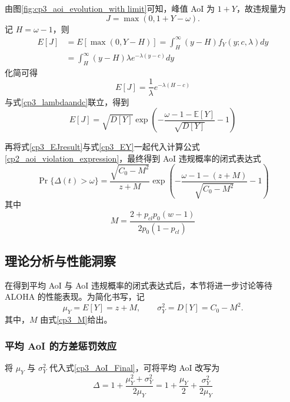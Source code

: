 由图\ref{fig:cp3_aoi_evolution_with limit}可知，峰值 AoI 为 $1+Y$，故违规量为
\[
J=\max(0,1+Y-\omega).
\]
记 $H=\omega-1$，则
\begin{equation}\label{cp3_EJ}
\begin{aligned}
    E[J] &= E[\max(0, Y - H)] = \int_{H}^{\infty} (y - H) f_Y(y; c, \lambda) dy \\
    &= \int_{H}^{\infty} (y-H)\lambda e^{-\lambda(y-c)}dy
\end{aligned}
\end{equation}
化简可得
\begin{equation}
    E[J]  = \frac{1}{\lambda} e^{-\lambda(H-c)}
\end{equation}
与式\eqref{cp3_lambdaandc}联立，得到
\begin{equation}\label{cp3_EJresult}
    E[J] = \sqrt{D[Y]} \exp\left( -\frac{\omega - 1 - \mathbb{E}[Y]}{\sqrt{D[Y]}} - 1 \right)
\end{equation}

再将式\eqref{cp3_EJresult}与式\eqref{cp3_EY}一起代入计算公式\eqref{cp2_aoi_violation_expression}，最终得到 AoI 违规概率的闭式表达式
\begin{equation}\label{cp3_violation_prob_simplified}
    \Pr\{\Delta(t) > \omega\} = \frac{\sqrt{C_0 - M^2}}{z + M} \exp\left( -\frac{\omega - 1 - (z + M)}{\sqrt{C_0 - M^2}} - 1 \right)
\end{equation}
其中
\begin{equation}\label{cp3_M}
    M = \frac{2 + p_{cl} p_0 (w-1)}{2 p_0 (1-p_{cl})}
\end{equation}

\subsection{理论分析与性能洞察}

在得到平均 AoI 与 AoI 违规概率的闭式表达式后，本节将进一步讨论等待 ALOHA 的性能表现。为简化书写，记
\[
\mu_Y = E[Y] = z + M,\qquad \sigma_Y^2 = D[Y] = C_0 - M^2.
\]
其中，$M$ 由式\eqref{cp3_M}给出。

\subsubsection{平均 AoI 的方差惩罚效应}

将 $\mu_Y$ 与 $\sigma_Y^2$ 代入式\eqref{cp3_AoI_Final}，可将平均 AoI 改写为
\begin{equation}\label{cp3_aoi_deconstructed}
    \Delta = 1 + \frac{\mu_Y^2 + \sigma_Y^2}{2\mu_Y} = 1 + \frac{\mu_Y}{2} + \frac{\sigma_Y^2}{2\mu_Y}
\end{equation}

